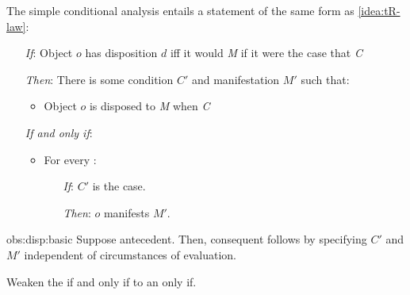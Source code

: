 \begin{note}
  The simple conditional analysis entails a statement of the same form as \autoref{idea:tR-law}:

  \begin{proposition}
    \label{obs:disp:basic}
    \vspace{-\baselineskip}
    \begin{itemize}
    \item[\emph{If}:]
      Object \(o\) has disposition \(d\) iff it would \emph{M} if it were the case that \emph{C}
    \item[\emph{Then}:]
      There is some condition \(C'\) and manifestation \(M'\) such that:
      \begin{itemize}
      \item
        Object \(o\) is disposed to \emph{M} when \emph{C}
      \end{itemize}

      \emph{If and only if}:

      \begin{itemize}
      \item
        For every :
        \begin{enumerate}
        \item[\emph{If}:]
          \(C'\) is the case.
        \item[\emph{Then}:]
          \(o\) manifests \(M'\).
        \end{enumerate}
      \end{itemize}
    \end{itemize}
    \vspace{-\baselineskip}
  \end{proposition}

  \begin{argument}{obs:disp:basic}
    Suppose antecedent.
    Then, consequent follows by specifying \(C'\) and \(M'\) independent of circumstances of evaluation.
  \end{argument}

  Weaken the if and only if to an only if.
\end{note}

